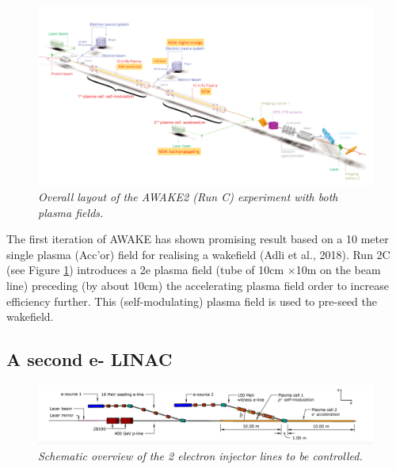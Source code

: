 \documentclass[12pt]{amsart}
\begin{document}
\begin{figure}[htbp] %
   \centering
   \includegraphics[width=5in]{im/awake2.png} 
   \caption{\em Overall layout of the AWAKE2 (Run C) experiment with both plasma fields.}
   \label{fig:run2c1}
\end{figure}

The first iteration of AWAKE has shown promising result based on a 10 meter single plasma (Acc'or) field for realising a wakefield (Adli et al., 2018).
Run 2C (see Figure \ref{fig:run2c1}) introduces a 2e plasma field (tube of 10cm $\times$10m on the beam line) 
preceding (by about 10cm) the accelerating plasma field order to increase efficiency further.
This (self-modulating) plasma field is used to pre-seed the wakefield.



 \subsection{A second e- LINAC}

\begin{figure}[htbp] %
   \centering
   \includegraphics[width=5in]{im/esys2.png} 
   \caption{\em Schematic overview of the 2 electron injector lines to be controlled.}
   \label{fig:elinac}
\end{figure}
\end{document}
